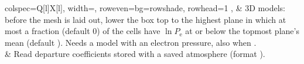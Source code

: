 \begin{longtblr}{colspec={Q[l]X[l]}, width=\linewidth, row{even}={bg=rowshade}, rowhead=1}
,  & 3D models: before the mesh is laid out, lower the box top to the highest plane in which at most a fraction  (default 0) of the cells have $\ln P_\mathrm{e}$ at or below the topmost plane's mean (default ). Needs a model with an electron pressure, also when .\\
 & Read departure coefficients stored with a saved atmosphere (format ).\\
\bottomrule
\end{longtblr}
